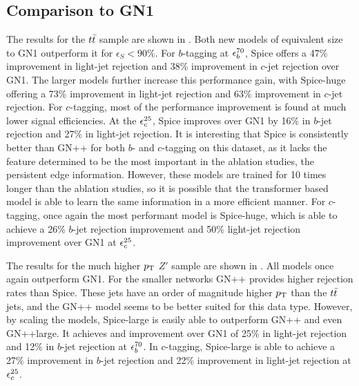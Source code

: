 \subsection{Comparison to GN1}

The results for the $t\bar{t}$ sample are shown in .
Both new models of equivalent size to GN1 outperform it for $\epsilon_S<90\%$.
For $b$-tagging at $\epsilon_b^{70}$, Spice offers a 47\% improvement in light-jet rejection and 38\% improvement in $c$-jet rejection over GN1.
The larger models further increase this performance gain, with Spice-huge offering a 73\% improvement in light-jet rejection and 63\% improvement in $c$-jet rejection.
For $c$-tagging, most of the performance improvement is
found at much lower signal efficiencies.
At the $\epsilon_c^{25}$, Spice improves over GN1 by 16\% in $b$-jet rejection and 27\% in light-jet rejection.
It is interesting that Spice is consistently better than GN++ for both $b$- and $c$-tagging on this dataset, as it lacks the feature determined to be the most important in the ablation studies, the persistent edge information.
However, these models are trained for 10 times longer than the ablation studies, so it is possible that the transformer based model is able to learn the same information in a more efficient manner.
For $c$-tagging, once again the most performant model is Spice-huge, which is able to achieve a 26\% $b$-jet rejection improvement and 50\% light-jet rejection improvement over GN1 at $\epsilon_c^{25}$.

The results for the much higher $p_{\text{T}}$ $Z'$ sample are shown in .
All models once again outperform GN1.
For the smaller networks GN++ provides higher rejection rates than Spice.
These jets have an order of magnitude higher $p_{\text{T}}$ than the $t\bar{t}$ jets, and the GN++ model seems to be better suited for this data type.
However, by scaling the models, Spice-large is easily able to outperform GN++ and even GN++large.
It achieves and improvement over GN1 of 25\% in light-jet rejection and 12\% in $b$-jet rejection at $\epsilon_b^{70}$.
In $c$-tagging, Spice-large is able to achieve a 27\% improvement in $b$-jet rejection and 22\% improvement in light-jet rejection at $\epsilon_c^{25}$.


